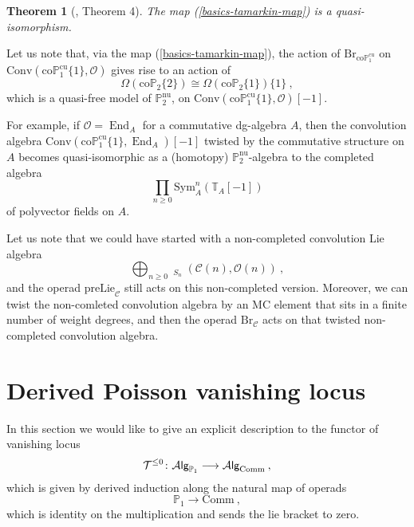 \documentclass[10pt, oneside]{amsart}
\theoremstyle{plain}
\newtheorem{theorem}[equation]{Theorem}
\newcommand{\Alg}{\mathcal{A}\text{\sf lg}}
\newcommand{\br}{\mathrm{Br}}
\newcommand{\C}{\mathcal{C}}
\newcommand{\comm}{\mathrm{Comm}}
\newcommand{\conv}{\mathrm{Conv}}
\DeclareMathOperator{\en}{End}
\renewcommand{\nu}{\mathrm{nu}}
\renewcommand{\O}{\mathcal{O}}
\newcommand{\PP}{\mathbb{P}}
\newcommand{\prelie}{\mathrm{preLie}}
\newcommand{\sym}{\mathrm{Sym}}
\newcommand{\TT}{\mathbb{T}}
\DeclareMathOperator{\uhom}{\underline{Hom}}
\newcommand{\coP}{\mathrm{co}\PP}
\newcommand{\cucoP}{\mathrm{co}\PP^{\text{cu}}}
\begin{document}
\begin{theorem}[\cite{Calaque_2015}, Theorem 4]
The map (\ref{basics-tamarkin-map}) is a quasi-isomorphism.
\end{theorem}
Let us note that, via the map (\ref{basics-tamarkin-map}), the action of $\br_{\cucoP_1}$ on $\conv(\cucoP_1\{1\}, \O)$ gives rise
to an action of
\begin{equation*}
\Omega(\coP_2\{2\}) \cong \Omega(\coP_2\{1\})\{1\} \:,
\end{equation*}
which is a quasi-free model of $\PP_2^\nu$,
on $\conv(\cucoP_1\{1\}, \O)[-1]$.
\begin{example} 
For example, if $\O = \en_A$ for a commutative dg-algebra $A$, then the convolution algebra $\conv(\cucoP_1\{1\}, \en_A)[-1]$ twisted
by the commutative structure on $A$ becomes quasi-isomorphic as a (homotopy) $\PP_2^\text{nu}$-algebra to the completed algebra
\begin{equation*}
\prod_{n \ge 0} \sym^n_A(\TT_A[-1])
\end{equation*}
of polyvector fields on $A$.
\end{example}
\begin{remark}
Let us note that we could have started with a non-completed convolution Lie algebra
\begin{equation*}
\bigoplus_{n \ge 0} \uhom_{S_n} (\C(n), \O(n)) \:,
\end{equation*}
and the operad $\prelie_\C$ still acts on this non-completed version. Moreover, we can twist the non-comleted convolution algebra
by an MC element that sits in a finite number of weight degrees, and then the operad $\br_\C$ acts on that twisted non-completed
convolution algebra.
\end{remark}




\section{Derived Poisson vanishing locus}\label{sec3}

In this section we would like to give an explicit description to the functor of vanishing locus\
\begin{equation*}
\mathcal{T}^{\le 0} \colon \Alg_{\PP_1} \longrightarrow \Alg_\comm \:,
\end{equation*}
which is given by derived induction along the natural map of operads
\begin{equation*}
\PP_1 \longrightarrow \comm \:,
\end{equation*}
which is identity on the multiplication and sends the lie bracket to zero.
\end{document}
